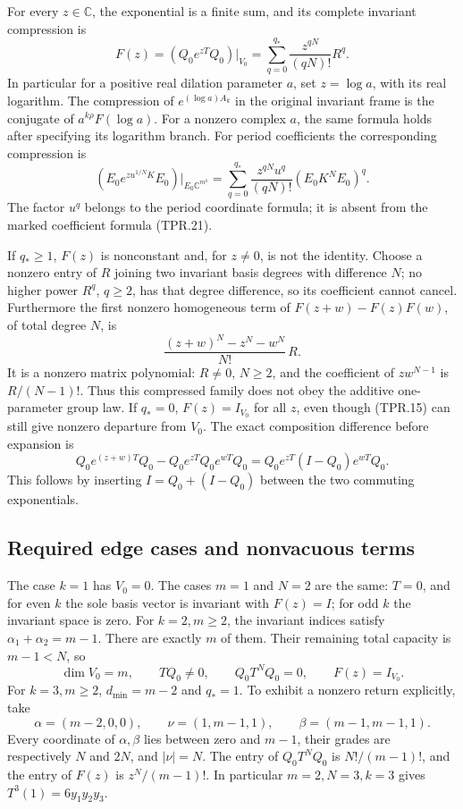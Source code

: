 For every \(z\in\mathbb C\), the exponential is a finite sum,
and its complete invariant compression is
\[
 F(z)=(Q_0e^{zT}Q_0)|_{V_0}
       =\sum_{q=0}^{q_*}\frac{z^{qN}}{(qN)!}R^q .
 \tag{TPR.21}
\]
In particular for a positive real dilation parameter \(a\),
set \(z=\log a\), with its real logarithm. The compression
of \(e^{(\log a)A_k}\) in the original invariant frame is
the conjugate of \(a^{k\rho}F(\log a)\).
For a nonzero complex \(a\), the same formula holds after
specifying its logarithm branch.
For period coefficients the corresponding compression is
\[
 \left(E_0e^{z u^{1/N}K}E_0\right)|_{E_0\mathbb C^{m^k}}
       =\sum_{q=0}^{q_*}
          \frac{z^{qN}u^q}{(qN)!}
             \left(E_0K^NE_0\right)^q .
 \tag{TPR.22}
\]
The factor \(u^q\) belongs to the period coordinate formula;
it is absent from the marked coefficient formula (TPR.21).

If \(q_*\geq1\), \(F(z)\) is nonconstant and, for \(z\ne0\),
is not the identity. Choose a nonzero entry of \(R\) joining
two invariant basis degrees with difference \(N\);
no higher power \(R^q\), \(q\geq2\), has that degree
difference, so its coefficient cannot cancel.
Furthermore the first nonzero homogeneous term of
\(F(z+w)-F(z)F(w)\), of total degree \(N\), is
\[
 \frac{(z+w)^N-z^N-w^N}{N!}\,R .
 \tag{TPR.23}
\]
It is a nonzero matrix polynomial: \(R\ne0\), \(N\geq2\),
and the coefficient of \(z w^{N-1}\) is \(R/(N-1)!\).
Thus this compressed family does not obey the additive
one-parameter group law. If \(q_*=0\), \(F(z)=I_{V_0}\)
for all \(z\), even though (TPR.15) can still give
nonzero departure from \(V_0\).
The exact composition difference before expansion is
\[
 Q_0e^{(z+w)T}Q_0-Q_0e^{zT}Q_0e^{wT}Q_0
    =Q_0e^{zT}(I-Q_0)e^{wT}Q_0 .
 \tag{TPR.24}
\]
This follows by inserting \(I=Q_0+(I-Q_0)\) between
the two commuting exponentials.

\subsection*{Required edge cases and nonvacuous terms}

The case \(k=1\) has \(V_0=0\). The cases \(m=1\) and
\(N=2\) are the same: \(T=0\), and for even \(k\) the
sole basis vector is invariant with \(F(z)=I\); for odd
\(k\) the invariant space is zero.
For \(k=2,m\geq2\), the invariant indices satisfy
\(\alpha_1+\alpha_2=m-1\). There are exactly \(m\) of
them. Their remaining total capacity is \(m-1<N\), so
\[
 \dim V_0=m,\qquad TQ_0\ne0,\qquad
 Q_0T^NQ_0=0,\qquad F(z)=I_{V_0}.
 \tag{TPR.25}
\]
For \(k=3,m\geq2\), \(d_{\min}=m-2\) and \(q_*=1\).
To exhibit a nonzero return explicitly, take
\[
 \alpha=(m-2,0,0),\qquad
 \nu=(1,m-1,1),\qquad
 \beta=(m-1,m-1,1).
 \tag{TPR.26}
\]
Every coordinate of \(\alpha,\beta\) lies between zero and
\(m-1\), their grades are respectively \(N\) and \(2N\),
and \(|\nu|=N\). The entry of \(Q_0T^NQ_0\) is
\(N!/(m-1)!\), and the entry of \(F(z)\) is
\(z^N/(m-1)!\). In particular \(m=2,N=3,k=3\)
gives \(T^3(1)=6y_1y_2y_3\).

